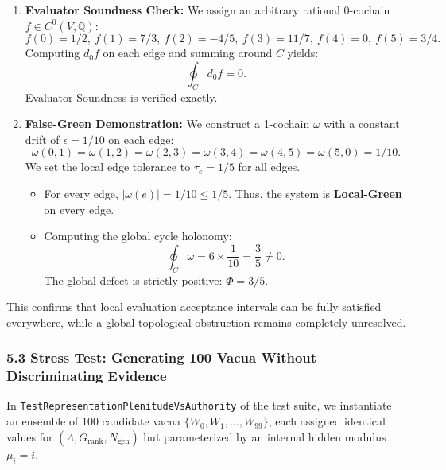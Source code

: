 \documentclass[
  10pt,
]{article}
\providecommand{\tightlist}{%
  \setlength{\itemsep}{0pt}\setlength{\parskip}{0pt}}
\providecommand{\tightlist}{%
  \setlength{\itemsep}{0pt}\setlength{\parskip}{0pt}}
\begin{document}
\begin{enumerate}
\def\labelenumi{\arabic{enumi}.}
\item
  \textbf{Evaluator Soundness Check:} We assign an arbitrary rational 0-cochain \hypertarget{math-E0085-0323}{}{\(f \in C^0(V, \mathbb{Q})\)}: \hypertarget{math-E0212-0324}{}{\[f(0) = 1/2, \ f(1) = 7/3, \ f(2) = -4/5, \ f(3) = 11/7, \ f(4) = 0, \ f(5) = 3/4.\]} Computing \hypertarget{math-E0086-0325}{}{\(d_0 f\)} on each edge and summing around \hypertarget{math-E0097-0326}{}{\(C\)} yields: \hypertarget{math-E0213-0327}{}{\[\oint_C d_0 f = 0.\]} Evaluator Soundness is verified exactly.
\item
  \textbf{False-Green Demonstration:} We construct a 1-cochain \hypertarget{math-E0099-0328}{}{\(\omega\)} with a constant drift of \hypertarget{math-E0214-0329}{}{\(\epsilon = 1/10\)} on each edge: \hypertarget{math-E0215-0330}{}{\[\omega(0, 1) = \omega(1, 2) = \omega(2, 3) = \omega(3, 4) = \omega(4, 5) = \omega(5, 0) = 1/10.\]} We set the local edge tolerance to \hypertarget{math-E0132-0331}{}{\(\tau_e = 1/5\)} for all edges.

  \begin{itemize}
  \tightlist
  \item
    For every edge, \hypertarget{math-E0216-0332}{}{\(|\omega(e)| = 1/10 \le 1/5\)}. Thus, the system is \textbf{Local-Green} on every edge.
  \item
    Computing the global cycle holonomy: \hypertarget{math-E0217-0333}{}{\[\oint_C \omega = 6 \times \frac{1}{10} = \frac{3}{5} \ne 0.\]} The global defect is strictly positive: \hypertarget{math-E0218-0334}{}{\(\Phi = 3/5\)}.
  \end{itemize}
\end{enumerate}

This confirms that local evaluation acceptance intervals can be fully satisfied everywhere, while a global topological obstruction remains completely unresolved.

\subsubsection{5.3 Stress Test: Generating 100 Vacua Without Discriminating Evidence}\label{stress-test-generating-100-vacua-without-discriminating-evidence}

In \texttt{TestRepresentationPlenitudeVsAuthority} of the test suite, we instantiate an ensemble of 100 candidate vacua \hypertarget{math-E0219-0335}{}{\(\{W_0, W_1, \ldots, W_{99}\}\)}, each assigned identical values for \hypertarget{math-E0220-0336}{}{\((\Lambda, G_{\text{rank}}, N_{\text{gen}})\)} but parameterized by an internal hidden modulus \hypertarget{math-E0221-0337}{}{\(\mu_i = i\)}.
\end{document}
